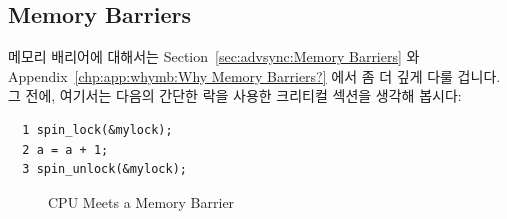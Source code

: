 \subsection{Memory Barriers}
\label{sec:cpu:Memory Barriers}

메모리 배리어에 대해서는 Section~\ref{sec:advsync:Memory Barriers} 와
Appendix~\ref{chp:app:whymb:Why Memory Barriers?} 에서 좀 더 깊게 다룰 겁니다.
그 전에, 여기서는 다음의 간단한 락을 사용한 크리티컬 섹션을 생각해 봅시다:

\vspace{5pt}
\begin{minipage}[t]{\columnwidth}
\small
\begin{verbatim}
  1 spin_lock(&mylock);
  2 a = a + 1;
  3 spin_unlock(&mylock);
\end{verbatim}
\end{minipage}
\vspace{5pt}

\begin{figure}[tb]
\centering
{}
\caption{CPU Meets a Memory Barrier}
\end{figure}

